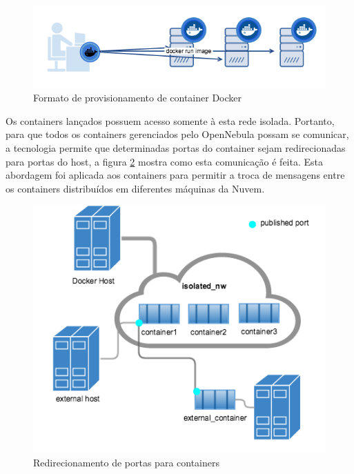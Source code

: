 \documentclass[twoside,english,brazilian]{UNISINOSartigo}
\begin{document}
\begin{figure}
	\caption{Formato de provisionamento de container Docker}
	\label{fig:provision-use-case}
	\centering%
	\begin{minipage}{0.8\textwidth}
		\includegraphics[scale=0.6]{provision-use-case}
	\end{minipage}
\end{figure}


Os containers lançados possuem acesso somente à esta rede isolada. Portanto, para que todos os containers gerenciados pelo OpenNebula possam se comunicar, a tecnologia permite que determinadas portas do container sejam redirecionadas para portas do host, a figura \ref{fig:network_access} mostra como esta comunicação é feita. Esta abordagem foi aplicada aos containers para permitir a troca de mensagens entre os containers distribuídos em diferentes máquinas da Nuvem.
\begin{figure}
	\caption{Redirecionamento de portas para containers}
	\label{fig:network_access}
	\centering%
	\begin{minipage}{0.8\textwidth}
		\includegraphics[width=\textwidth]{network_access}
	\end{minipage}
\end{figure}
\end{document}
